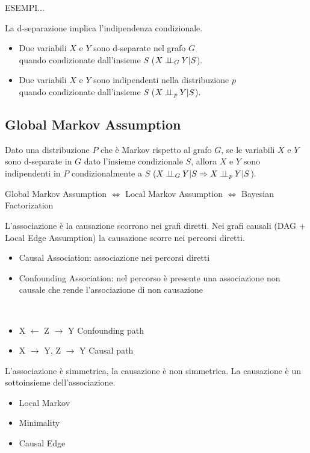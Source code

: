 ESEMPI...

La d-separazione implica l'indipendenza condizionale.

\begin{itemize}
  \item Due variabili $X$ e $Y$ sono d-separate nel grafo $G$ \\quando condizionate dall'insieme $S$ ($X \ind_G Y | S$).
  \item Due variabili $X$ e $Y$ sono indipendenti nella distribuzione $p$ \\quando condizionate dall'insieme $S$ ($X \ind_p Y | S$).
\end{itemize}

\subsection*{Global Markov Assumption}
Dato una distribuzione $P$ che è Markov rispetto al grafo $G$, se le variabili $X$ e $Y$ sono d-separate in $G$ dato l'insieme condizionale $S$, 
allora $X$ e $Y$ sono indipendenti in $P$ condizionalmente a $S$ ($X \ind_G Y | S \Rightarrow X \ind_p Y | S$).

Global Markov Assumption $\Leftrightarrow$ Local Markov Assumption $\Leftrightarrow$ Bayesian Factorization

L'associazione è la causazione scorrono nei grafi diretti. Nei grafi causali (DAG + Local Edge Assumption) la causazione scorre nei percorsi diretti.

\begin{itemize}
  \item Causal Association: associazione nei percorsi diretti
  \item Confounding Association: nel percorso è presente una associazione non causale che rende l'associazione di non causazione
\end{itemize}

\bigskip
\begin{center}
  \begin{minipage}[c]{0.3\linewidth}
    \vspace{0pt}\
  \end{minipage}
  \begin{minipage}[c]{0.5\linewidth}
    \begin{itemize}
      \setlength\itemsep{1em}
      \item X $\leftarrow$ Z $\rightarrow$ Y  \hfill Confounding path
      \item X $\rightarrow$ Y, Z $\rightarrow$ Y \hfill Causal path 
    \end{itemize}
  \end{minipage}
\end{center}
\bigskip

L'associazione è simmetrica, la causazione è non simmetrica. La causazione è un sottoinsieme dell'associazione.

\begin{itemize}
  \item Local Markov
  \item Minimality
  \item Causal Edge
\end{itemize}
